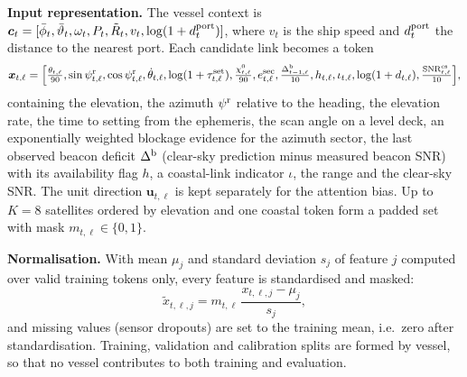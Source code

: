 \textbf{Input representation.} The vessel context is $\bm c_t=[\bar\phi_t,\bar\vartheta_t,\omega_t,P_t,\tilde R_t,v_t,\log(1+d^{\rm port}_t)]$, where $v_t$ is the ship speed and $d^{\rm port}_t$ the distance to the nearest port. Each candidate link becomes a token
\begin{equation}\label{eq:token}
\bm x_{t,\ell}=\Big[\tfrac{\theta_{t,\ell}}{90},\sin\psi^{\rm r}_{t,\ell},\cos\psi^{\rm r}_{t,\ell},\dot\theta_{t,\ell},\log(1+\tau^{\rm set}_{t,\ell}),\tfrac{\chi^0_{t,\ell}}{90},e^{\rm sec}_{t,\ell},\tfrac{\Delta^{\rm b}_{t-1,\ell}}{10},h_{t,\ell},\iota_{t,\ell},\log(1+d_{t,\ell}),\tfrac{\mathrm{SNR}^{\rm cs}_{t,\ell}}{10}\Big],
\end{equation}
containing the elevation, the azimuth $\psi^{\rm r}$ relative to the heading, the elevation rate, the time to setting from the ephemeris, the scan angle on a level deck, an exponentially weighted blockage evidence for the azimuth sector, the last observed beacon deficit $\Delta^{\rm b}$ (clear-sky prediction minus measured beacon SNR) with its availability flag $h$, a coastal-link indicator $\iota$, the range and the clear-sky SNR. The unit direction $\bm u_{t,\ell}$ is kept separately for the attention bias. Up to $K=8$ satellites ordered by elevation and one coastal token form a padded set with mask $m_{t,\ell}\in\{0,1\}$.

\textbf{Normalisation.} With mean $\mu_j$ and standard deviation $s_j$ of feature $j$ computed over valid training tokens only, every feature is standardised and masked:
\begin{equation}\label{eq:norm}
\tilde x_{t,\ell,j}=m_{t,\ell}\,\frac{x_{t,\ell,j}-\mu_j}{s_j},
\end{equation}
and missing values (sensor dropouts) are set to the training mean, i.e.\ zero after standardisation. Training, validation and calibration splits are formed by vessel, so that no vessel contributes to both training and evaluation.

